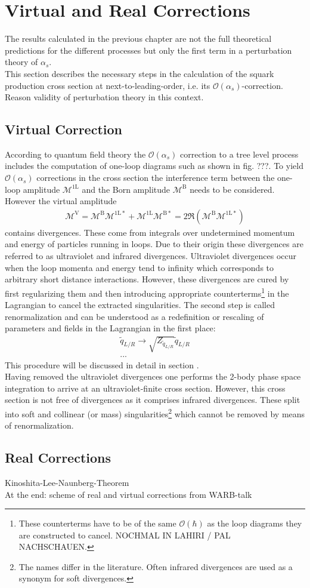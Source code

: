 \section{Virtual and Real Corrections}
The results calculated in the previous chapter are not the full theoretical predictions for the different processes but only the first term in a perturbation theory of $\alpha_s$.\\
This section describes the necessary steps in the calculation of the squark production cross section at next-to-leading-order, i.e. its $\mathcal{O}(\alpha_s)$-correction.\\
Reason validity of perturbation theory in this context.


\subsection{Virtual Correction}
According to quantum field theory the $\mathcal{O}(\alpha_s)$ correction to a tree level process includes the computation of one-loop diagrams such as shown in fig. ???. To yield $\mathcal{O}(\alpha_s)$ corrections in the cross section the interference term between the one-loop amplitude $\mathcal{M}^{\mathrm{1L}}$ and the Born amplitude $\mathcal{M}^{\mathrm{B}}$ needs to be considered. However the virtual amplitude 
\begin{align}
\mathcal{M}^{\mathrm{V}} = \mathcal{M}^{\mathrm{B}} \mathcal{M}^{\mathrm{1L}\ast} + \mathcal{M}^{\mathrm{1L}} \mathcal{M}^{\mathrm{B}\ast} = 2 \Re \left( \mathcal{M}^{\mathrm{B}} \mathcal{M}^{\mathrm{1L}\ast} \right)
\end{align}
contains divergences. These come from integrals over undetermined momentum and energy of particles running in loops. Due to their origin these divergences are referred to as ultraviolet and infrared divergences.
Ultraviolet divergences occur when the loop momenta and energy tend to infinity which corresponds to arbitrary short distance interactions. However, these divergences are cured by first regularizing them and then introducing appropriate counterterms\footnote{These counterterms have to be of the same $\mathcal{O}(\hbar)$ as the loop diagrams they are constructed to cancel. NOCHMAL IN LAHIRI / PAL NACHSCHAUEN.} in the Lagrangian to cancel the extracted singularities. The second step is called renormalization and can be understood as a redefinition or rescaling of parameters and fields in the Lagrangian in the first place:
\begin{align}
\tilde{q}_{L/R} \to \sqrt{Z_{\tilde{q}_{L/R}}} \tilde{q}_{L/R}\\
...
\end{align}
This procedure will be discussed in detail in section \label{sec:renMRSSM}.\\
Having removed the ultraviolet divergences one performs the 2-body phase space integration to arrive at an ultraviolet-finite cross section. However, this cross section is not free of divergences as it comprises infrared divergences. These split into soft and collinear (or mass) singularities\footnote{The names differ in the literature. Often infrared divergences are used as a synonym for soft divergences.} which cannot be removed by means of renormalization.


\subsection{Real Corrections}
Kinoshita-Lee-Naunberg-Theorem\\
At the end: scheme of real and virtual corrections from WARB-talk